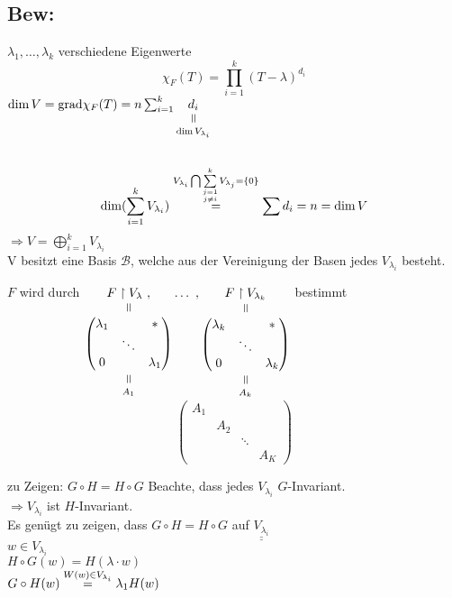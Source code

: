 \documentclass[titlepage,12pt,a4paper,ngerman]{report}
\newcommand{\verteq}{\rotatebox{90}{$\,=$}}
\newcommand{\equalto}[2]{\underset{\scriptstyle\overset{\mkern4mu\verteq}{#2}}{#1}}
\newcommand{\tx}[1]{\textrm{#1}}
\newcommand{\grad}{\tx{grad}}
\begin{document}
\subsection{Bew:}
$\lambda_1,\dots , \lambda_k$ verschiedene Eigenwerte
$$\chi_F(T) = \prod_{i=1}^{k}(T-\lambda)^{d_i}$$
$\dim V = \grad \chi_F(T) = n\sum_{i=1}^{k} \equalto{d_i}{\dim V_{\lambda_i}}$\\\\
$$\dim(\sum_{i=1}^{k} V_{\lambda_i}) \buildrel V_{\lambda_i} \bigcap \sum\limits_{\tiny{\substack{j=1 \\ j \neq i}}}^{k} V_{\lambda_j} = \{0\}\over = \sum d_i = n = \dim V$$
$\Rightarrow V = \bigoplus^{k}_{i=1} V_{\lambda_i}$\\
V besitzt eine Basis $ \mathcal{B} $, welche aus der Vereinigung der Basen jedes $V_{\lambda_i}$ besteht.

$F$ wird durch $\equalto{F \upharpoonright V_\lambda\ ,}{\equalto{\begin{pmatrix}
		\lambda_1 & & * \\ & \ddots & \\ 0 & & \lambda_1
		\end{pmatrix}}{A_1}} \dots \ ,\equalto{F \upharpoonright V_{\lambda_k}}{\equalto{\begin{pmatrix}
		\lambda_k & & * \\ & \ddots & \\ 0 & & \lambda_k
		\end{pmatrix}}{A_k}}$ bestimmt \\

$$\begin{pmatrix}
A_1 &&&\\ &A_2&&\\ &&\ddots &\\ &&&A_K
\end{pmatrix}$$



zu Zeigen: $G\circ H = H\circ G$ Beachte, dass jedes $V_{\lambda_i}$ $G$-Invariant.\\
$\Rightarrow V_{\lambda_i}$ ist $H$-Invariant.\\
Es genügt zu zeigen, dass $G\circ H = H\circ G$ auf $\underline{\underline{V_{\lambda_i}}}$\\ 
$w \in V_{\lambda_i}$\\
$H\circ G(w) = H(\lambda\cdot w)$\\

$G\circ H (w) \buildrel{W(w) \in V_{\lambda_i}} \over{=} \lambda_1 H(w)$
\end{document}
